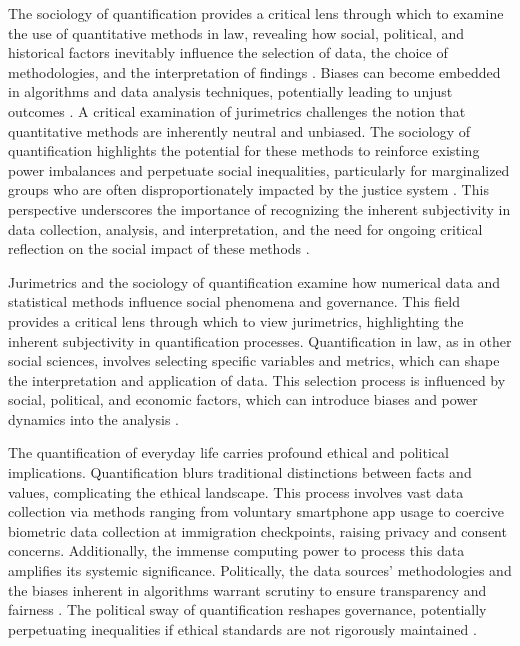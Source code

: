 The sociology of quantification provides a critical lens through which to examine the use of quantitative methods in law, revealing how social, political, and historical factors inevitably influence the selection of data, the choice of methodologies, and the interpretation of findings \cite{10.5040/9781350220645,10.1080/07329113.2015.1046739}. Biases can become embedded in algorithms and data analysis techniques, potentially leading to unjust outcomes \cite{10.5040/9781350220645,10.1080/07329113.2015.1046739}. A critical examination of jurimetrics challenges the notion that quantitative methods are inherently neutral and unbiased. The sociology of quantification highlights the potential for these methods to reinforce existing power imbalances and perpetuate social inequalities, particularly for marginalized groups who are often disproportionately impacted by the justice system \cite{10.5040/9781350220645,10.1080/07329113.2015.1046739}. This perspective underscores the importance of recognizing the inherent subjectivity in data collection, analysis, and interpretation, and the need for ongoing critical reflection on the social impact of these methods \cite{10.5040/9781350220645,10.1080/07329113.2015.1046739}.

Jurimetrics and the sociology of quantification examine how numerical data and statistical methods influence social phenomena and governance. This field provides a critical lens through which to view jurimetrics, highlighting the inherent subjectivity in quantification processes. Quantification in law, as in other social sciences, involves selecting specific variables and metrics, which can shape the interpretation and application of data. This selection process is influenced by social, political, and economic factors, which can introduce biases and power dynamics into the analysis \cite{salais2016}.

The quantification of everyday life carries profound ethical and political implications. Quantification blurs traditional distinctions between facts and values, complicating the ethical landscape. This process involves vast data collection via methods ranging from voluntary smartphone app usage to coercive biometric data collection at immigration checkpoints, raising privacy and consent concerns. Additionally, the immense computing power to process this data amplifies its systemic significance. Politically, the data sources' methodologies and the biases inherent in algorithms warrant scrutiny to ensure transparency and fairness \cite{sareen2020}. The political sway of quantification reshapes governance, potentially perpetuating inequalities if ethical standards are not rigorously maintained \cite{camargo2022}.


